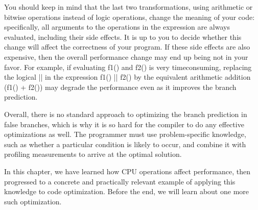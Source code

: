You should keep in mind that the last two transformations, using arithmetic or bitwise operations instead of logic operations, change the meaning of your code: specifically, all arguments to the operations in the expression are always evaluated, including their side effects. It is up to you to decide whether this change will affect the correctness of your program. If these side effects are also expensive, then the overall performance change may end up being not in your favor. For example, if evaluating f1() and f2() is very timeconsuming, replacing the logical || in the expression f1() || f2() by the equivalent arithmetic addition (f1() + f2()) may degrade the performance even as it improves the branch prediction.

Overall, there is no standard approach to optimizing the branch prediction in false branches, which is why it is so hard for the compiler to do any effective optimizations as well. The programmer must use problem-specific knowledge, such as whether a particular condition is likely to occur, and combine it with profiling measurements to arrive at the optimal solution.

In this chapter, we have learned how CPU operations affect performance, then progressed to a concrete and practically relevant example of applying this knowledge to code optimization. Before the end, we will learn about one more such optimization.



























